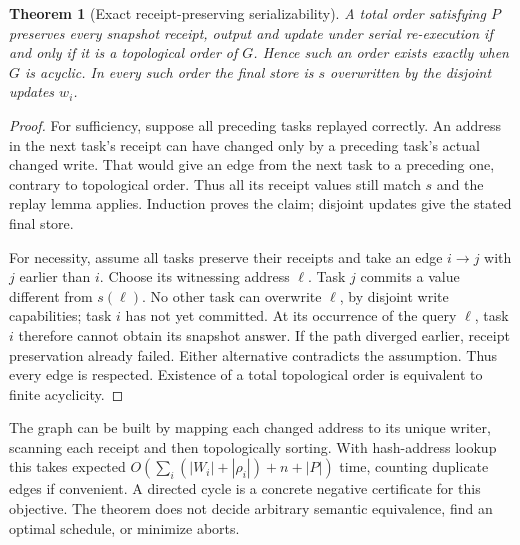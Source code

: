 \documentclass[11pt]{article}
\newtheorem{theorem}{Theorem}\newtheorem{lemma}{Lemma}\newtheorem{proposition}{Proposition}
\begin{document}
\begin{theorem}[Exact receipt-preserving serializability]
A total order satisfying $P$ preserves every snapshot receipt, output and update under serial re-execution if and only if it is a topological order of $G$. Hence such an order exists exactly when $G$ is acyclic. In every such order the final store is $s$ overwritten by the disjoint updates $w_i$.
\end{theorem}
\begin{proof}
For sufficiency, suppose all preceding tasks replayed correctly. An address in the next task's receipt can have changed only by a preceding task's actual changed write. That would give an edge from the next task to a preceding one, contrary to topological order. Thus all its receipt values still match $s$ and the replay lemma applies. Induction proves the claim; disjoint updates give the stated final store.

For necessity, assume all tasks preserve their receipts and take an edge $i\to j$ with $j$ earlier than $i$. Choose its witnessing address $\ell$. Task $j$ commits a value different from $s(\ell)$. No other task can overwrite $\ell$, by disjoint write capabilities; task $i$ has not yet committed. At its occurrence of the query $\ell$, task $i$ therefore cannot obtain its snapshot answer. If the path diverged earlier, receipt preservation already failed. Either alternative contradicts the assumption. Thus every edge is respected. Existence of a total topological order is equivalent to finite acyclicity.
\end{proof}
The graph can be built by mapping each changed address to its unique writer, scanning each receipt and then topologically sorting. With hash-address lookup this takes expected $O(\sum_i(|W_i|+|\rho_i|)+n+|P|)$ time, counting duplicate edges if convenient. A directed cycle is a concrete negative certificate for this objective. The theorem does not decide arbitrary semantic equivalence, find an optimal schedule, or minimize aborts.
\end{document}
